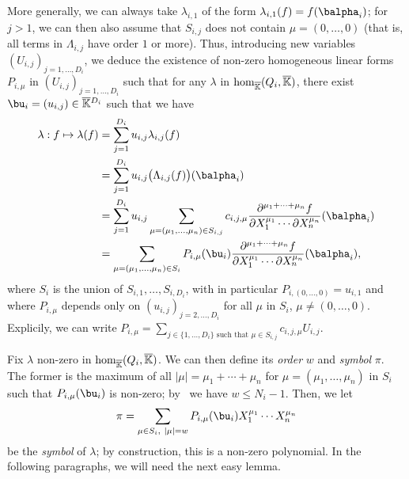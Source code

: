 \documentclass[12pt]{article}
\def\Kbar {{\ensuremath{\overline{\mathbb{K}}}}}
\begin{document}
More generally, we can always take $\lambda_{i,1}$ of the form
$\lambda_{i,1}(f) = f(\balpha_i)$; for $j>1$, we can then also assume
that $S_{i,j}$ does not contain $\mu=(0,\dots,0)$ (that is, all terms
in $\Lambda_{i,j}$ have order $1$ or more). Thus, introducing new
variables $(U_{i,j})_{j =1,\dots,D_i}$, we deduce the existence of
non-zero homogeneous linear forms $P_{i,\mu}$ in
$(U_{i,j})_{j=1,\dots,D_i}$ such that for any $\lambda$ in ${\rm
	hom}_\Kbar(Q_i,\Kbar)$, there exist $\bu_i=(u_{i,j}) \in
\Kbar{}^{D_i}$ such that we have
\begin{align}\label{ell_param}
\lambda: f \mapsto \lambda(f)
&= \sum_{j=1}^{D_i} u_{i,j} \lambda_{i,j}(f)\nonumber\\
&= \sum_{j=1}^{D_i} u_{i,j} \big(\Lambda_{i,j}(f)\big)(\balpha_i)\nonumber\\
&= \sum_{j=1}^{D_i} u_{i,j}
\sum_{\mu=(\mu_1,\dots,\mu_n) \in
	S_{i,j}} c_{i,j,\mu} \frac{ \partial^{\mu_1 + \cdots + \mu_n} f}
{\partial X_1^{\mu_1} \cdots \partial X_n^{\mu_n}}(\balpha_i)\nonumber\\
&= \sum_{\mu=(\mu_1,\dots,\mu_n) \in S_i} P_{i,\mu}(\bu_i)
\frac{ \partial^{\mu_1 + \cdots + \mu_n} f}
{\partial X_1^{\mu_1} \cdots \partial X_n^{\mu_n}}(\balpha_i),
\end{align}
where $S_i$ is  the union of $S_{i,1},\dots,S_{i,D_i}$,
with in particular $P_{i,(0,\dots,0)}=u_{i,1}$ and where $P_{i,\mu}$
depends only on $(u_{i,j})_{j =2,\dots,D_i}$ for all $\mu$ in $S_i$,
$\mu \ne (0,\dots,0)$. Explicily, we can write $P_{i,\mu}=\sum_{j\in
	\{1,\dots,D_i\} \text{~such that~} \mu \in S_{i,j}} c_{i,j,\mu}
U_{i,j}$.

Fix $\lambda$ non-zero in ${\rm hom}_\Kbar(Q_i,\Kbar)$. We can then
define its {\em order} $w$ and {\em symbol} $\pi$. The former is
the maximum of all $|\mu|=\mu_1+\cdots+\mu_n$ for
$\mu=(\mu_1,\dots,\mu_n)$ in $S_i$ such that $P_{i,\mu}(\bu_i)$ is
non-zero; by~\cite[Lemma~3.3]{Mourrain97} we have $w \le
N_i-1$. Then, we let
$$\pi =\sum_{\mu \in S_i,\ |\mu|=w}P_{i,\mu}(\bu_i) X_1^{\mu_1} \cdots
X_n^{\mu_n}$$ be the {\em symbol} of $\lambda$; by construction,
this is a non-zero polynomial. In the following paragraphs, we will
need the next easy lemma.
\end{document}
